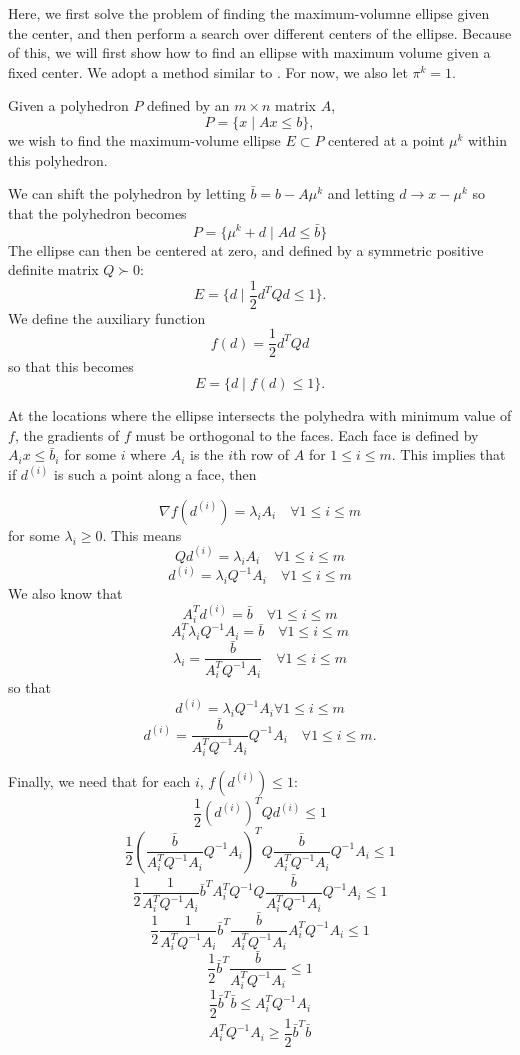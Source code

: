 \documentclass{article}
\theoremstyle{case}
\begin{document}
\label{ellipse_optimization}

Here, we first solve the problem of finding the maximum-volumne ellipse given the center, and then perform a search over different centers of the ellipse.
Because of this, we will first show how to find an ellipse with maximum volume given a fixed center.
We adopt a method similar to \cite{Khachiyan1993}.
For now, we also let $\pi^k = 1$.

Given a polyhedron $P$ defined by an $m \times n$ matrix $A$,
\[
P = \{ x \; | \;  Ax \le b \},
\]
we wish to find the maximum-volume ellipse $E \subset P$ centered at a point $\mu^{k}$ within this polyhedron.

We can shift the polyhedron by letting $\bar{b} = b - A\mu^{k}$ and letting $d \to x - \mu^{k}$ so that the polyhedron becomes
\[
P = \{ \mu^k + d \; | \;  Ad \le \bar{b} \}
\]
The ellipse can then be centered at zero, and defined by a symmetric positive definite matrix $Q \succ 0$:
\[
E = \{ d \; | \; \frac 1 2 d^T Q d \le 1 \}.
\]
We define the auxiliary function 
\[
f(d) = \frac 1 2 d^T Q d
\]
so that this becomes
\[
E = \{ d \; | \; f(d) \le 1 \}.
\]

At the locations where the ellipse intersects the polyhedra with minimum value of $f$, the gradients of $f$ must be orthogonal to the faces.
Each face is defined by $A_i x \le \bar{b}_i$ for some $i$ where $A_i$ is the $i$th row of $A$ for $1\le i \le m$.
This implies that if $d^{(i)}$ is such a point along a face, then



\[
\nabla f(d^{(i)}) = \lambda_i A_i \quad \forall 1\le i\le m
\]
for some $\lambda_i \ge 0$.
This means
\[
Q d^{(i)} = \lambda_i A_i \quad \forall 1\le i\le m
\]
\[
d^{(i)} = \lambda_i Q^{-1}A_i \quad \forall 1\le i\le m
\]
We also know that 
\[
A_i^T d^{(i)} = \bar{b} \quad \forall 1\le i\le m
\]
\[
A_i^T \lambda_i Q^{-1}A_i = \bar{b} \quad \forall 1\le i\le m
\]
\[
\lambda_i = \frac {\bar{b}}{A_i^T  Q^{-1}A_i} \quad \forall 1\le i\le m
\]
so that 
\[
d^{(i)} = \lambda_i Q^{-1}A_i \forall 1\le i\le m
\]
\[
d^{(i)} = \frac {\bar{b}}{A_i^T  Q^{-1}A_i}  Q^{-1}A_i \quad \forall 1\le i\le m.
\]

Finally, we need that for each $i$, $f(d^{(i)}) \le 1$:
\[
\frac 1 2 (d^{(i)})^{T} Q d^{(i)} \le 1
\]
\[
\frac 1 2 (\frac {\bar{b}}{A_i^T  Q^{-1}A_i}  Q^{-1}A_i)^{T} Q \frac {\bar{b}}{A_i^T  Q^{-1}A_i}  Q^{-1}A_i \le 1
\]
\[
\frac 1 2 \frac {1}{A_i^T  Q^{-1}A_i}  \bar{b}^T A_i^T Q^{-1} Q \frac {\bar{b}}{A_i^T  Q^{-1}A_i}  Q^{-1}A_i \le 1
\]
\[
\frac 1 2 \frac {1}{A_i^T  Q^{-1}A_i}  \bar{b}^T \frac {\bar{b}}{A_i^T  Q^{-1}A_i}  A_i^T Q^{-1}A_i \le 1
\]
\[
\frac 1 2 \bar{b}^T \frac {\bar{b}}{A_i^T  Q^{-1}A_i} \le 1
\]
\[
\frac 1 2 \bar{b}^T \bar{b}\le A_i^T  Q^{-1}A_i
\]
\[
A_i^T  Q^{-1}A_i \ge \frac 1 2 \bar{b}^T \bar{b}
\]
\end{document}
